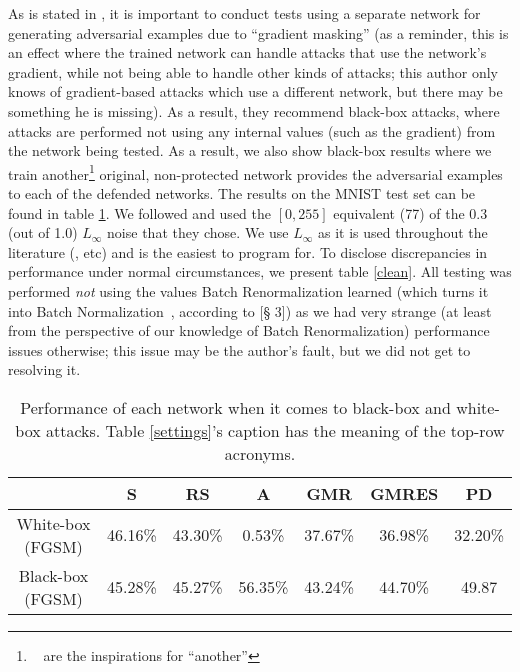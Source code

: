 As is stated in \cite{athalye2018obfuscated}, it is important to conduct tests using a separate
network for generating adversarial examples due to ``gradient masking'' (as a reminder, this is an
effect where the trained network can handle attacks that use the network's gradient, while not being
able to handle other kinds of attacks; this author only knows of gradient-based attacks which use a
different network, but there may be something he is missing). As a result, they recommend black-box
attacks, where attacks are performed not using any internal values (such as the gradient) from the
network being tested. As a result, we also show black-box results where we train
another\footnote{~\cite{madry2019deep, szegedy2014intriguing} are the inspirations for ``another''}
original, non-protected network provides the adversarial examples to each of the defended networks.
The results on the MNIST test set can be found in table \ref{defensiveproficiency}. We followed
\cite{madry2019deep} and used the $[0, 255]$ equivalent (77) of the 0.3 (out of 1.0) $L_\infty$
noise that they chose. We use $L_{\infty}$ as it is used throughout the literature
(\cite{goodfellow2015explaining, madry2019deep, tramèr2020ensemble}, etc) and is the easiest to
program for. To disclose discrepancies in performance under normal circumstances, we present table
\ref{clean}. All testing was performed \textit{not} using the values Batch Renormalization learned
(which turns it into Batch Normalization~\cite{ioffe2015batch}, according to \cite{ioffe2017batch}[§
3]) as we had very strange (at least from the perspective of our knowledge of Batch Renormalization)
performance issues otherwise; this issue may be the author's fault, but we did not get to resolving
it.

\begin{table}
    \begin{center}
        \begin{tabular}{| c | c | c | c | c | c | c |}
            \hline
                             &      S      &    RS     &    A     &   GMR     &   GMRES   &   PD     \\
            \hline
            White-box (FGSM) &  46.16\%    &  43.30\%  &  0.53\%  &  37.67\%  &  36.98\%  &  32.20\% \\
            Black-box (FGSM) &  45.28\%    &  45.27\%  &  56.35\% &  43.24\%  &  44.70\%  &  49.87   \\
            \hline
        \end{tabular}
    \end{center}
    \caption{Performance of each network when it comes to black-box and white-box attacks.
             Table \ref{settings}'s caption has the meaning of the top-row acronyms.}
    \label{defensiveproficiency}
\end{table}

